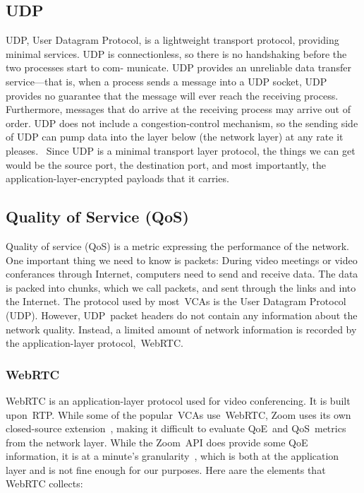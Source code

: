     \subsection{UDP}\label{introduction:qos:udp}
        UDP, User Datagram Protocol, is a lightweight transport protocol, providing minimal services. UDP is connectionless, so there is no handshaking before the two processes start to com- municate. UDP provides an unreliable data transfer service—that is, when a process sends a message into a UDP socket, UDP provides no guarantee that the message will ever reach the receiving process. Furthermore, messages that do arrive at the receiving process may arrive out of order. UDP does not include a congestion-control mechanism, so the sending side of UDP can pump data into the layer below (the network layer) at any rate it pleases.~\autocite{alma990025667610203776} Since UDP is a minimal transport layer protocol, the things we can get would be the source port, the destination port, and most importantly, the application-layer-encrypted payloads that it carries.


    \subsection{Quality of Service (QoS)}\label{introduction:qos}
        Quality of service (QoS) is a metric expressing the performance of the network. One important thing we need to know is packets: During video meetings or video conferances through Internet, computers need to send and receive data. The data is packed into chunks, which we call packets, and sent through the links and into the Internet. The protocol used by most~VCAs is the User Datagram Protocol (UDP). However, UDP~packet headers do not contain any information about the network quality. Instead, a limited amount of network information is recorded by the application-layer protocol,~WebRTC.

        \subsubsection{WebRTC}\label{introduction:qos:webrtc}
            WebRTC is an application-layer protocol used for video conferencing. It is built upon~RTP. While some of the popular~VCAs use~WebRTC, Zoom uses its own closed-source extension~\autocite{marczak2020}, making it difficult to evaluate QoE~and QoS~metrics from the network layer. While the Zoom~API does provide some QoE information, it is at a minute's granularity~\autocite{walia2019}, which is both at the application layer and is not fine enough for our purposes. Here aare the elements that WebRTC collects:

